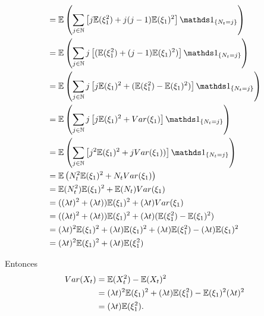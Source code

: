 \begin{align}
                &=  \E\left(\sum_{j \in \N} \left[ j \E(\xi_1^2) + j(j-1) \E(\xi_1)^2  \right] \indic_{\{ N_t = j\}} \right)                                                \\
                &=  \E\left(\sum_{j \in \N} j \left[  (\E(\xi_1^2) + (j-1) \E(\xi_1)^2) \right] \indic_{\{ N_t = j\}} \right)                                               \\
                &=  \E\left(\sum_{j \in \N} j \left[ j \E(\xi_1)^2 + (\E(\xi_1^2) - \E(\xi_1)^2) \right] \indic_{\{ N_t = j\}} \right)                                      \\
                &=  \E\left(\sum_{j \in \N} j \left[ j \E(\xi_1)^2 + Var(\xi_1) \right] \indic_{\{ N_t = j\}} \right)                                                       \\
                &=  \E\left(\sum_{j \in \N} \left[ j^2 \E(\xi_1)^2 + j Var(\xi_1)) \right] \indic_{\{ N_t = j\}} \right)                                                    \\
                &=  \E\left( N_t^2 \E(\xi_1)^2 + N_t Var(\xi_1)  \right)                                                                                                    \\
                &=  \E( N_t^2) \E(\xi_1)^2 + \E(N_t) Var(\xi_1)                                                                                                             \\
                &=  ((\lambda t)^2 + (\lambda t) ) \E(\xi_1)^2 + (\lambda t) Var(\xi_1)                                                                                     \\
                &=  ((\lambda t)^2 + (\lambda t) ) \E(\xi_1)^2 + (\lambda t) (\E(\xi_1^2) - \E(\xi_1)^2)                                                                    \\
                &=  (\lambda t)^2\E(\xi_1)^2 + (\lambda t)\E(\xi_1)^2 + (\lambda t) \E(\xi_1^2) - (\lambda t)\E(\xi_1)^2                                                    \\
                &=  (\lambda t)^2\E(\xi_1)^2 + (\lambda t) \E(\xi_1^2)                                                                                                      \\
\end{align}\pn

Entonces
\begin{align}
    Var(X_t)    &=  \mathbb{E}(X_t^2) - \mathbb{E}(X_t)^2                                                           \\
                &=  (\lambda t)^2\mathbb{E}(\xi_1)^2 + (\lambda t) \mathbb{E}(\xi_1^2) - \mathbb{E}(\xi_1)^2 (\lambda t)^2  \\
                &=  (\lambda t) \mathbb{E}(\xi_1^2). 
\end{align}\pn

